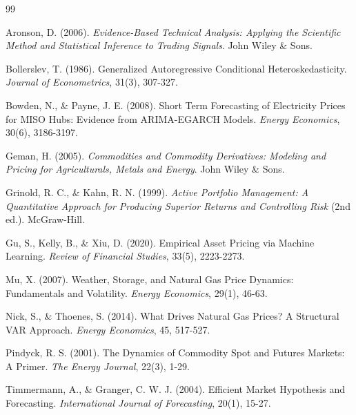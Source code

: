 \documentclass[12pt,a4paper]{article}
\begin{document}
\newpage
\begin{thebibliography}{99}

Aronson, D. (2006). \textit{Evidence-Based Technical Analysis: Applying the Scientific Method and Statistical Inference to Trading Signals}. John Wiley \& Sons.

Bollerslev, T. (1986). Generalized Autoregressive Conditional Heteroskedasticity. \textit{Journal of Econometrics}, 31(3), 307-327.

Bowden, N., \& Payne, J. E. (2008). Short Term Forecasting of Electricity Prices for MISO Hubs: Evidence from ARIMA-EGARCH Models. \textit{Energy Economics}, 30(6), 3186-3197.

Geman, H. (2005). \textit{Commodities and Commodity Derivatives: Modeling and Pricing for Agriculturals, Metals and Energy}. John Wiley \& Sons.

Grinold, R. C., \& Kahn, R. N. (1999). \textit{Active Portfolio Management: A Quantitative Approach for Producing Superior Returns and Controlling Risk} (2nd ed.). McGraw-Hill.

Gu, S., Kelly, B., \& Xiu, D. (2020). Empirical Asset Pricing via Machine Learning. \textit{Review of Financial Studies}, 33(5), 2223-2273.

Mu, X. (2007). Weather, Storage, and Natural Gas Price Dynamics: Fundamentals and Volatility. \textit{Energy Economics}, 29(1), 46-63.

Nick, S., \& Thoenes, S. (2014). What Drives Natural Gas Prices? A Structural VAR Approach. \textit{Energy Economics}, 45, 517-527.

Pindyck, R. S. (2001). The Dynamics of Commodity Spot and Futures Markets: A Primer. \textit{The Energy Journal}, 22(3), 1-29.

Timmermann, A., \& Granger, C. W. J. (2004). Efficient Market Hypothesis and Forecasting. \textit{International Journal of Forecasting}, 20(1), 15-27.

\end{thebibliography}

\newpage
\appendix
\end{document}
